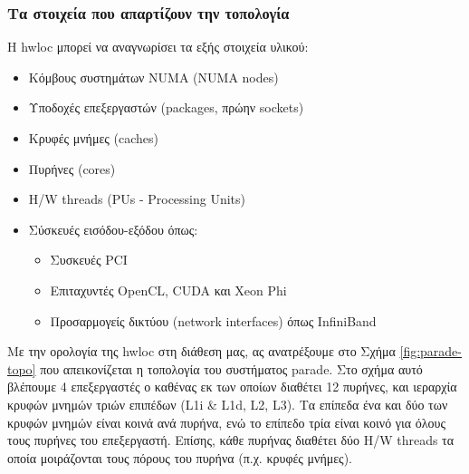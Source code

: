 \subsubsection{Τα στοιχεία που απαρτίζουν την τοπολογία}
Η hwloc μπορεί να αναγνωρίσει τα εξής στοιχεία υλικού:
\begin{itemize}
	\item Κόμβους συστημάτων NUMA (NUMA nodes)
	\item Υποδοχές επεξεργαστών (packages, πρώην sockets)
	\item Κρυφές μνήμες (caches)
	\item Πυρήνες (cores)
	\item H/W threads (PUs - Processing Units)
	\item Σύσκευές εισόδου-εξόδου όπως:
	\begin{itemize}
		\item Συσκευές PCI
		\item Επιταχυντές OpenCL, CUDA και Xeon Phi
		\item Προσαρμογείς δικτύου (network interfaces) όπως InfiniBand	
	\end{itemize}
\end{itemize}

Με την ορολογία της hwloc στη διάθεση μας, ας ανατρέξουμε στο Σχήμα \ref{fig:parade-topo} που απεικονίζεται η τοπολογία του συστήματος parade. Στο σχήμα αυτό βλέπουμε 4 επεξεργαστές ο καθένας εκ των οποίων διαθέτει 12 πυρήνες, και ιεραρχία κρυφών μνημών τριών επιπέδων (L1i \& L1d, L2, L3). Τα επίπεδα ένα και δύο των κρυφών μνημών είναι κοινά ανά πυρήνα, ενώ το επίπεδο τρία είναι κοινό για όλους τους πυρήνες του επεξεργαστή. Επίσης, κάθε πυρήνας διαθέτει δύο H/W threads τα οποία μοιράζονται τους πόρους του πυρήνα (π.χ. κρυφές μνήμες).

